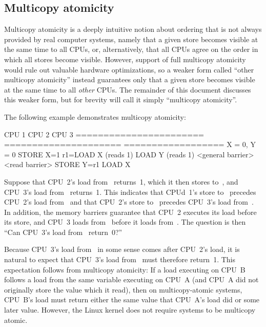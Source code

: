 \subsection{Multicopy atomicity}
\label{sec:Multicopy atomicity}

Multicopy atomicity is a deeply intuitive notion about ordering that is
not always provided by real computer systems, namely that a given store
becomes visible at the same time to all CPUs, or, alternatively, that all
CPUs agree on the order in which all stores become visible.
However, support of full multicopy atomicity would rule out valuable
hardware optimizations, so a weaker form called ``other multicopy atomicity''
instead guarantees only that a given store becomes visible at the same
time to all \emph{other} CPUs.
The remainder of this document discusses this weaker form, but for brevity
will call it simply ``multicopy atomicity''.

The following example demonstrates multicopy atomicity:

\begin{VerbatimU}
	CPU 1                   CPU 2                 CPU 3
	======================= ===================== ==================
		{ X = 0, Y = 0 }
	STORE X=1               r1=LOAD X (reads 1)   LOAD Y (reads 1)
	                        <general barrier>     <read barrier>
	                        STORE Y=r1            LOAD X
\end{VerbatimU}

Suppose that CPU~2's load from~ returns~1, which it then stores to~,
and CPU~3's load from~ returns~1.
This indicates that CPUd~1's store to~ precedes CPU~2's load from~ and
that CPU~2's store to~ precedes CPU~3's load from~.
In addition, the memory barriers guarantee that CPU~2 executes its load
before its store, and CPU~3 loads from~ before it loads from~.
The question is then ``Can CPU~3's load from~ return~0?''

Because CPU~3's load from~ in some sense comes after CPU~2's load, it
is natural to expect that CPU~3's load from~ must therefore return~1.
This expectation follows from multicopy atomicity:
If a load executing on CPU~B follows a load from the same variable
executing on CPU~A (and CPU~A did not originally store the value which
it read), then on multicopy-atomic systems, CPU~B's load must return
either the same value that CPU~A's load did or some later value.
However, the Linux kernel does not require systems to be multicopy atomic.

